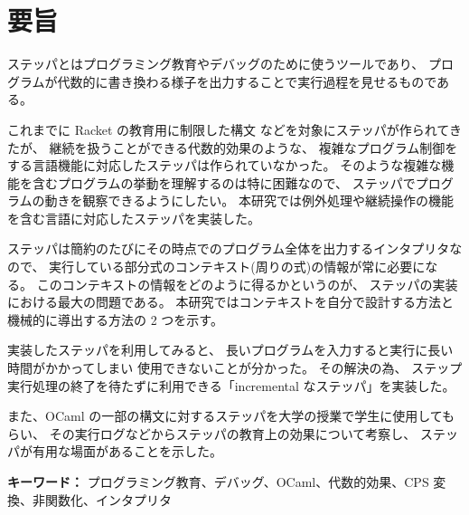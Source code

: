 \chapter*{要旨}

ステッパとはプログラミング教育やデバッグのために使うツールであり、
プログラムが代数的に書き換わる様子を出力することで実行過程を見せるものである。

これまでに Racket の教育用に制限した構文
などを対象にステッパが作られてきたが、
継続を扱うことができる代数的効果のような、
複雑なプログラム制御をする言語機能に対応したステッパは作られていなかった。
そのような複雑な機能を含むプログラムの挙動を理解するのは特に困難なので、
ステッパでプログラムの動きを観察できるようにしたい。
本研究では例外処理や継続操作の機能を含む言語に対応したステッパを実装した。

ステッパは簡約のたびにその時点でのプログラム全体を出力するインタプリタなので、
実行している部分式のコンテキスト(周りの式)の情報が常に必要になる。
このコンテキストの情報をどのように得るかというのが、
ステッパの実装における最大の問題である。
本研究ではコンテキストを自分で設計する方法と
機械的に導出する方法の 2 つを示す。

実装したステッパを利用してみると、
長いプログラムを入力すると実行に長い時間がかかってしまい
使用できないことが分かった。
その解決の為、
ステップ実行処理の終了を待たずに利用できる「incremental なステッパ」を実装した。

また、OCaml の一部の構文に対するステッパを大学の授業で学生に使用してもらい、
その実行ログなどからステッパの教育上の効果について考察し、
ステッパが有用な場面があることを示した。

\vspace{10mm}

{\bf キーワード：}
プログラミング教育、デバッグ、OCaml、代数的効果、CPS 変換、非関数化、インタプリタ\ 

